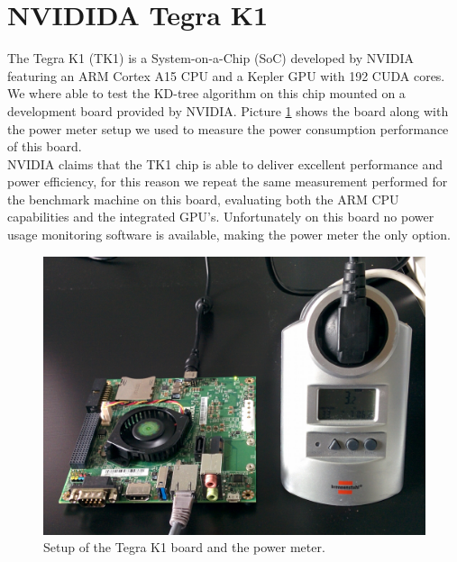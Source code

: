 \section{NVIDIDA Tegra K1}
The Tegra K1 (TK1) is a System-on-a-Chip (SoC) developed by NVIDIA featuring an ARM Cortex A15 CPU and a Kepler GPU with 192 CUDA cores.  We where able to test the KD-tree algorithm on this chip mounted on a development board provided by NVIDIA. Picture \ref{tk1_photo} shows the board along with the power meter setup we used to measure the power consumption performance of this board.\\
NVIDIA claims that the TK1 chip is able to deliver excellent performance and power efficiency, for this reason we repeat the same measurement performed for the benchmark machine on this board, evaluating both the ARM CPU capabilities and the integrated GPU's. Unfortunately on this board no power usage monitoring software is available, making the power meter the only option.

\begin{figure}
\includegraphics[width=\textwidth]{power/tk1.jpg}
\caption{Setup of the Tegra K1 board and the power meter.}
\label{tk1_photo}
\end{figure}

